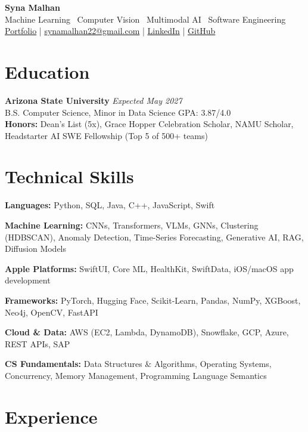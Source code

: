 \documentclass[a4paper,8pt]{extarticle}
\begin{document}
\begin{center}
{\Large \textbf{Syna Malhan}}\\
Machine Learning \textbullet\  Computer Vision \textbullet\  Multimodal AI \textbullet\  Software Engineering\\
\href{https://synamalhan.github.io/website/}{Portfolio}
\;|\;
\href{mailto:synamalhan22@gmail.com}{synamalhan22@gmail.com}
\;|\;
\href{https://www.linkedin.com/in/synamalhan/}{LinkedIn}
\;|\;
\href{https://github.com/synamalhan}{GitHub}
\end{center}

\section*{Education}

\noindent
\textbf{Arizona State University} \hfill \textit{Expected May 2027}\\
\noindent
B.S. Computer Science, Minor in Data Science \hfill GPA: 3.87/4.0\\
\noindent
\textbf{Honors:} Dean's List (5x), Grace Hopper Celebration Scholar, NAMU Scholar, Headstarter AI SWE Fellowship (Top 5 of 500+ teams)

\section*{Technical Skills}

\noindent
\textbf{Languages:} Python, SQL, Java, C++, JavaScript, Swift

\noindent
\textbf{Machine Learning:} CNNs, Transformers, VLMs, GNNs, Clustering (HDBSCAN), Anomaly Detection, Time-Series Forecasting, Generative AI, RAG, Diffusion Models

\noindent
\textbf{Apple Platforms:} SwiftUI, Core ML, HealthKit, SwiftData, iOS/macOS app development

\noindent
\textbf{Frameworks:} PyTorch, Hugging Face, Scikit-Learn, Pandas, NumPy, XGBoost, Neo4j, OpenCV, FastAPI

\noindent
\textbf{Cloud \& Data:} AWS (EC2, Lambda, DynamoDB), Snowflake, GCP, Azure, REST APIs, SAP

\noindent
\textbf{CS Fundamentals:} Data Structures \& Algorithms, Operating Systems, Concurrency, Memory Management, Programming Language Semantics

\section*{Experience}
\end{document}
